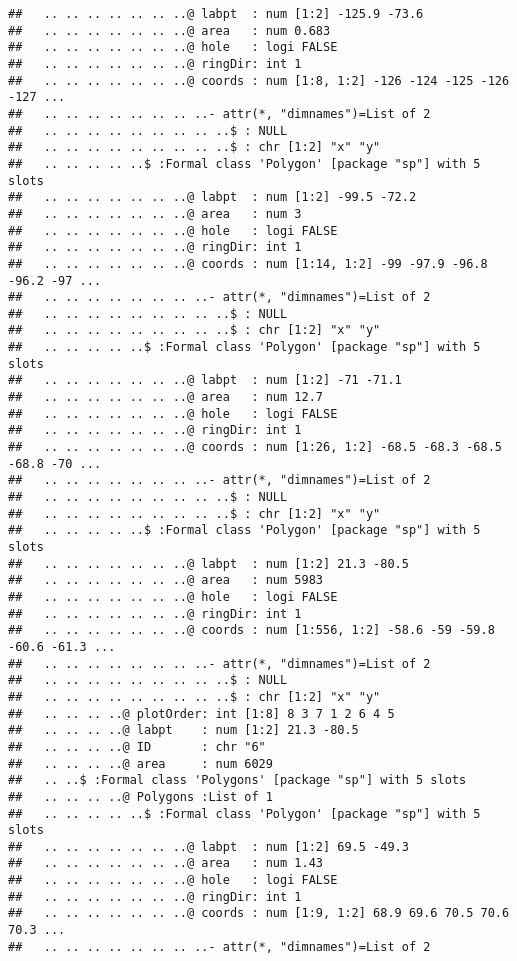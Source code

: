 \documentclass[]{article}
\begin{document}
\begin{verbatim}
##   .. .. .. .. .. .. ..@ labpt  : num [1:2] -125.9 -73.6
##   .. .. .. .. .. .. ..@ area   : num 0.683
##   .. .. .. .. .. .. ..@ hole   : logi FALSE
##   .. .. .. .. .. .. ..@ ringDir: int 1
##   .. .. .. .. .. .. ..@ coords : num [1:8, 1:2] -126 -124 -125 -126 -127 ...
##   .. .. .. .. .. .. .. ..- attr(*, "dimnames")=List of 2
##   .. .. .. .. .. .. .. .. ..$ : NULL
##   .. .. .. .. .. .. .. .. ..$ : chr [1:2] "x" "y"
##   .. .. .. .. ..$ :Formal class 'Polygon' [package "sp"] with 5 slots
##   .. .. .. .. .. .. ..@ labpt  : num [1:2] -99.5 -72.2
##   .. .. .. .. .. .. ..@ area   : num 3
##   .. .. .. .. .. .. ..@ hole   : logi FALSE
##   .. .. .. .. .. .. ..@ ringDir: int 1
##   .. .. .. .. .. .. ..@ coords : num [1:14, 1:2] -99 -97.9 -96.8 -96.2 -97 ...
##   .. .. .. .. .. .. .. ..- attr(*, "dimnames")=List of 2
##   .. .. .. .. .. .. .. .. ..$ : NULL
##   .. .. .. .. .. .. .. .. ..$ : chr [1:2] "x" "y"
##   .. .. .. .. ..$ :Formal class 'Polygon' [package "sp"] with 5 slots
##   .. .. .. .. .. .. ..@ labpt  : num [1:2] -71 -71.1
##   .. .. .. .. .. .. ..@ area   : num 12.7
##   .. .. .. .. .. .. ..@ hole   : logi FALSE
##   .. .. .. .. .. .. ..@ ringDir: int 1
##   .. .. .. .. .. .. ..@ coords : num [1:26, 1:2] -68.5 -68.3 -68.5 -68.8 -70 ...
##   .. .. .. .. .. .. .. ..- attr(*, "dimnames")=List of 2
##   .. .. .. .. .. .. .. .. ..$ : NULL
##   .. .. .. .. .. .. .. .. ..$ : chr [1:2] "x" "y"
##   .. .. .. .. ..$ :Formal class 'Polygon' [package "sp"] with 5 slots
##   .. .. .. .. .. .. ..@ labpt  : num [1:2] 21.3 -80.5
##   .. .. .. .. .. .. ..@ area   : num 5983
##   .. .. .. .. .. .. ..@ hole   : logi FALSE
##   .. .. .. .. .. .. ..@ ringDir: int 1
##   .. .. .. .. .. .. ..@ coords : num [1:556, 1:2] -58.6 -59 -59.8 -60.6 -61.3 ...
##   .. .. .. .. .. .. .. ..- attr(*, "dimnames")=List of 2
##   .. .. .. .. .. .. .. .. ..$ : NULL
##   .. .. .. .. .. .. .. .. ..$ : chr [1:2] "x" "y"
##   .. .. .. ..@ plotOrder: int [1:8] 8 3 7 1 2 6 4 5
##   .. .. .. ..@ labpt    : num [1:2] 21.3 -80.5
##   .. .. .. ..@ ID       : chr "6"
##   .. .. .. ..@ area     : num 6029
##   .. ..$ :Formal class 'Polygons' [package "sp"] with 5 slots
##   .. .. .. ..@ Polygons :List of 1
##   .. .. .. .. ..$ :Formal class 'Polygon' [package "sp"] with 5 slots
##   .. .. .. .. .. .. ..@ labpt  : num [1:2] 69.5 -49.3
##   .. .. .. .. .. .. ..@ area   : num 1.43
##   .. .. .. .. .. .. ..@ hole   : logi FALSE
##   .. .. .. .. .. .. ..@ ringDir: int 1
##   .. .. .. .. .. .. ..@ coords : num [1:9, 1:2] 68.9 69.6 70.5 70.6 70.3 ...
##   .. .. .. .. .. .. .. ..- attr(*, "dimnames")=List of 2

\end{verbatim}
\end{document}

